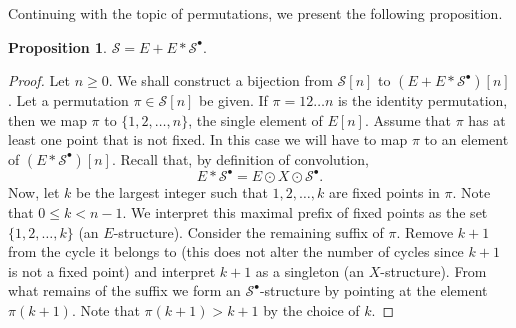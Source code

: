 \documentclass[a4paper, 11pt]{article}
\newcommand{\Sym}{\mathcal{S}}
\theoremstyle{definition}
\newtheorem{proposition}[theorem]{Proposition}
\begin{document}
Continuing with the topic of permutations, we present
the following proposition.

\begin{proposition}\label{prop: Sym convolution}
  $\Sym = E + E*\Sym^{\bullet}$.
\end{proposition}
\begin{proof}
  Let $n\geq 0$.  We shall construct a bijection from
  $\Sym[n]$ to $(E + E*\Sym^{\bullet})[n]$.  Let a permutation
  $\pi\in\Sym[n]$ be given. If $\pi=12\ldots n$ is the identity
  permutation, then we map $\pi$ to $\{1,2,\ldots,n\}$, the single
  element of $E[n]$. Assume that $\pi$ has at least one point that is
  not fixed.  In this case we will have to map $\pi$ to an
  element of $(E*\Sym^{\bullet})[n]$. Recall that, by definition of
  convolution,
  \[
    E*\Sym^{\bullet} = E\odot X \odot \Sym^{\bullet}.
  \]
  Now, let $k$ be the largest integer such that $1,2,\dots,k$ are fixed
  points in $\pi$. Note that $0\leq k<n-1$. We interpret this maximal
  prefix of fixed points as the set $\{1,2,\dots,k\}$ (an
  $E$-structure). Consider the remaining suffix of $\pi$. Remove $k+1$
  from the cycle it belongs to (this does not alter the number of cycles
  since $k+1$ is not a fixed point) and interpret $k+1$ as a singleton
  (an $X$-structure). From what remains of the suffix we form an
  $\Sym^{\bullet}$-structure by pointing at the element $\pi(k+1)$. Note
  that $\pi(k+1) > k+1$ by the choice of $k$.
\end{proof}
\end{document}
